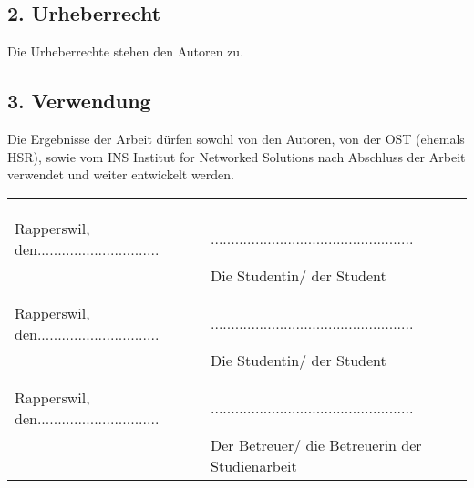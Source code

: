 \subsection*{2. Urheberrecht}
    Die Urheberrechte stehen den Autoren zu.

\subsection*{3. Verwendung}
    Die Ergebnisse der Arbeit dürfen sowohl von den Autoren, von der OST (ehemals HSR), 
    sowie vom INS Institut for Networked Solutions nach Abschluss der Arbeit verwendet
    und weiter entwickelt werden.

\begin{tabularx}{\textwidth}{XX}
    & \\
    & \\
    & \\
    Rapperswil, den.............................. & .................................................. \\
    & Die Studentin/ der Student \\
    & \\
    & \\
    Rapperswil, den.............................. & .................................................. \\
    & Die Studentin/ der Student \\
    & \\
    & \\
    Rapperswil, den.............................. & .................................................. \\
    & Der Betreuer/ die Betreuerin der Studienarbeit \\
\end{tabularx}